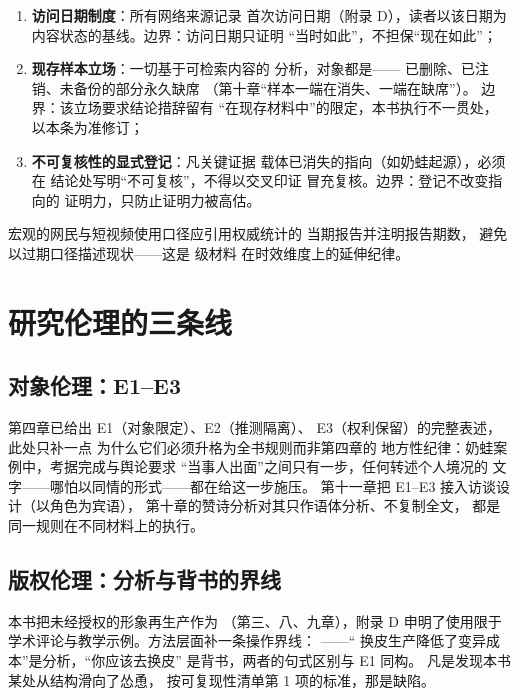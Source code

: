 \begin{enumerate}[label=\arabic*.]
  \item \textbf{访问日期制度}：所有网络来源记录
        首次访问日期（附录 D），读者以该日期为
        内容状态的基线。边界：访问日期只证明
        “当时如此”，不担保“现在如此”；
  \item \textbf{现存样本立场}：一切基于可检索内容的
        分析，对象都是——
        已删除、已注销、未备份的部分永久缺席
        （第十章“样本一端在消失、一端在缺席”）。
        边界：该立场要求结论措辞留有
        “在现存材料中”的限定，本书执行不一贯处，
        以本条为准修订；
  \item \textbf{不可复核性的显式登记}：凡关键证据
        载体已消失的指向（如奶蛙起源），必须在
        结论处写明“不可复核”，不得以交叉印证
        冒充复核。边界：登记不改变指向的
        证明力，只防止证明力被高估。
\end{enumerate}

宏观的网民与短视频使用口径应引用权威统计的
当期报告并注明报告期数\cite{baidu-index}，
避免以过期口径描述现状——这是  级材料
在时效维度上的延伸纪律。

\section{研究伦理的三条线}\label{sec:12:ethics}

\subsection{对象伦理：E1--E3}

第四章已给出 E1（对象限定）、E2（推测隔离）、
E3（权利保留）的完整表述，此处只补一点
为什么它们必须升格为全书规则而非第四章的
地方性纪律：奶蛙案例中，考据完成与舆论要求
“当事人出面”之间只有一步，任何转述个人境况的
文字——哪怕以同情的形式——都在给这一步施压。
第十一章把 E1--E3 接入访谈设计（以角色为宾语），
第十章的赞诗分析对其只作语体分析、不复制全文，
都是同一规则在不同材料上的执行。

\subsection{版权伦理：分析与背书的界线}

本书把未经授权的形象再生产作为
（第三、八、九章），附录 D 申明了使用限于
学术评论与教学示例。方法层面补一条操作界线：
——“
换皮生产降低了变异成本”是分析，“你应该去换皮”
是背书，两者的句式区别与 E1 同构。
凡是发现本书某处从结构滑向了怂恿，
按可复现性清单第 1 项的标准，那是缺陷。


